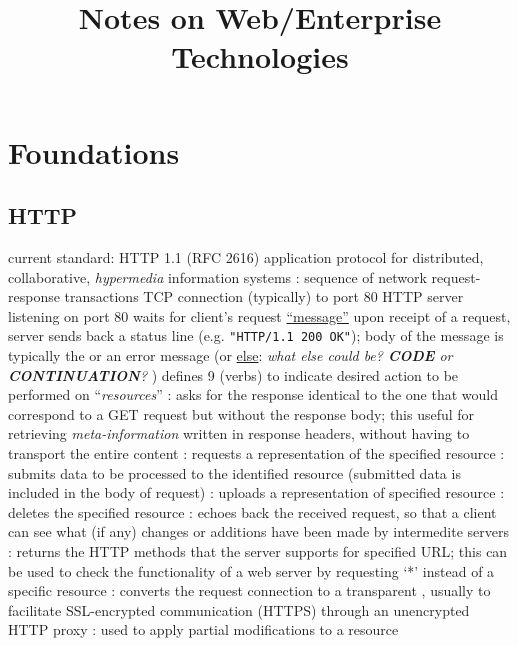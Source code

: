 \documentclass{myproc}
\begin{document}
\title{\large\bf Notes on Web/Enterprise Technologies}
\date{}
\maketitle

\small

\tableofcontents

\section{Foundations}
\subsection{HTTP}
\bit
\w current standard: HTTP 1.1 (RFC 2616)
\w application protocol for distributed, collaborative, {\em hypermedia\/}
information systems 
\w {}: sequence of network request-response transactions
  \bit
  \w TCP connection (typically) to port 80
  \w HTTP server listening on port 80 waits for client's request \underline{``message''}
  \w upon receipt of a request, server sends back a status line
  (e.g. \verb+"HTTP/1.1 200 OK"+); body of the message is typically the
   or an error message (or \underline{else}: {\em what
    else could be? {\bf CODE\/} or {\bf CONTINUATION}?}  )
  \eit
\w defines 9  (verbs) to indicate desired action to be performed
on ``{\em{}resources\/}''
  \ben
  \w {}: asks for the response identical to the one that would
  correspond to a GET request but without the response body; this useful for
  retrieving {\em meta-information\/} written in response headers, without
  having to transport the entire content
  \w {}: requests a representation of the specified resource
  \w {}: submits data to be processed to the identified resource
  (submitted data is included in the body of request) 
  \w {}: uploads a representation of specified resource
  \w {}: deletes the specified resource
  \w {}: echoes back the received request, so that a client can see
  what (if any) changes or additions have been made by intermedite servers
  \w {}: returns the HTTP methods that the server supports for
  specified URL; this can be used to check the functionality of a web server
  by requesting `*' instead of a specific resource
  \w {}: converts the request connection to a transparent , usually to facilitate SSL-encrypted communication (HTTPS) through
  an unencrypted HTTP proxy
  \w {}: used to apply partial modifications to a resource
  \een
\eit
\end{document}
